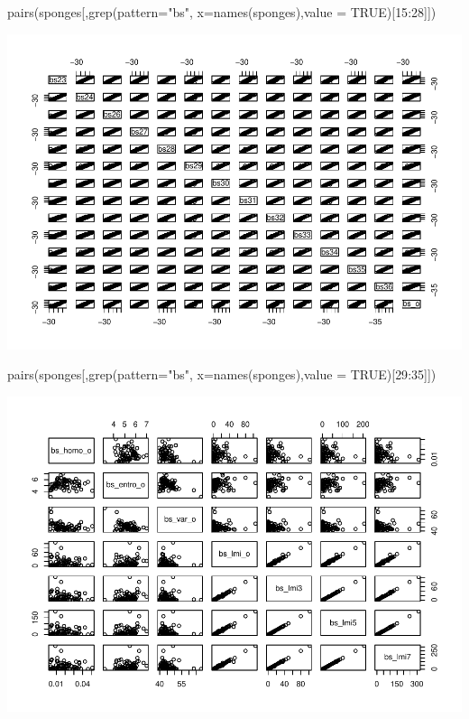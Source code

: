 \documentclass[
]{book}
\newenvironment{Shaded}{\begin{snugshade}}{\end{snugshade}}
\newcommand{\AttributeTok}[1]{\textcolor[rgb]{0.77,0.63,0.00}{#1}}
\newcommand{\ConstantTok}[1]{\textcolor[rgb]{0.00,0.00,0.00}{#1}}
\newcommand{\DecValTok}[1]{\textcolor[rgb]{0.00,0.00,0.81}{#1}}
\newcommand{\FunctionTok}[1]{\textcolor[rgb]{0.00,0.00,0.00}{#1}}
\newcommand{\NormalTok}[1]{#1}
\newcommand{\SpecialCharTok}[1]{\textcolor[rgb]{0.00,0.00,0.00}{#1}}
\newcommand{\StringTok}[1]{\textcolor[rgb]{0.31,0.60,0.02}{#1}}
\begin{document}
\begin{Shaded}
\begin{Highlighting}[]
\FunctionTok{pairs}\NormalTok{(sponges[,}\FunctionTok{grep}\NormalTok{(}\AttributeTok{pattern=}\StringTok{"bs"}\NormalTok{, }\AttributeTok{x=}\FunctionTok{names}\NormalTok{(sponges),}\AttributeTok{value =} \ConstantTok{TRUE}\NormalTok{)[}\DecValTok{15}\SpecialCharTok{:}\DecValTok{28}\NormalTok{]])}
\end{Highlighting}
\end{Shaded}

\includegraphics{ECOMODbook_files/figure-latex/unnamed-chunk-24-2.pdf}

\begin{Shaded}
\begin{Highlighting}[]
\FunctionTok{pairs}\NormalTok{(sponges[,}\FunctionTok{grep}\NormalTok{(}\AttributeTok{pattern=}\StringTok{"bs"}\NormalTok{, }\AttributeTok{x=}\FunctionTok{names}\NormalTok{(sponges),}\AttributeTok{value =} \ConstantTok{TRUE}\NormalTok{)[}\DecValTok{29}\SpecialCharTok{:}\DecValTok{35}\NormalTok{]])}
\end{Highlighting}
\end{Shaded}

\includegraphics{ECOMODbook_files/figure-latex/unnamed-chunk-24-3.pdf}
\end{document}

